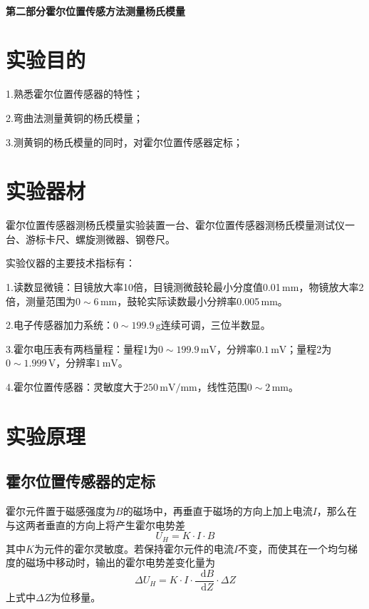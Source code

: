 \documentclass[UTF-8,twoside,cs4size]{ctexart}
\newcommand*{\dif}{\mathop{}\!\mathrm{d}}
\begin{document}
	~\
	
	\begin{center}
		\Large\bfseries 第二部分\quad 霍尔位置传感方法测量杨氏模量
	\end{center}
	\setcounter{section}{0}
	
	\section{实验目的}
	1.熟悉霍尔位置传感器的特性；
	
	2.弯曲法测量黄铜的杨氏模量；
	
	3.测黄铜的杨氏模量的同时，对霍尔位置传感器定标；
		
	\section{实验器材}
	霍尔位置传感器测杨氏模量实验装置一台、霍尔位置传感器测杨氏模量测试仪一台、游标卡尺、螺旋测微器、钢卷尺。
	
	{\kaishu 实验仪器的主要技术指标有：}
	
	{\kaishu 1.读数显微镜：目镜放大率10倍，目镜测微鼓轮最小分度值0.01\,mm，物镜放大率2倍，测量范围为$ 0\sim 6\,\mathrm{mm} $，鼓轮实际读数最小分辨率0.005\,mm。}
	
	{\kaishu 2.电子传感器加力系统：$ 0\sim 199.9\,\mathrm{g} $连续可调，三位半数显。}
	
	{\kaishu 3.霍尔电压表有两档量程：量程1为$ 0\sim 199.9\,\mathrm{mV} $，分辨率$ 0.1\,\mathrm{mV} $；量程2为$ 0\sim 1.999\,\mathrm{V} $，分辨率$ 1\,\mathrm{mV} $。}
	
	{\kaishu 4.霍尔位置传感器：灵敏度大于$ 250\,\mathrm{mV/mm} $，线性范围$ 0\sim 2\,\mathrm{mm} $。}
	
	\section{实验原理}
	
	\subsection{霍尔位置传感器的定标}
	霍尔元件置于磁感强度为$ B $的磁场中，再垂直于磁场的方向上加上电流$ I $，那么在与这两者垂直的方向上将产生霍尔电势差
	\[U_H=K\cdot I\cdot B\]
	其中$ K $为元件的霍尔灵敏度。若保持霍尔元件的电流$ I $不变，而使其在一个均匀梯度的磁场中移动时，输出的霍尔电势差变化量为
	\[\Delta U_H=K\cdot I\cdot\frac{\dif B}{\dif Z}\cdot\Delta Z\]
	上式中$ \Delta Z $为位移量。
	
\end{document}
